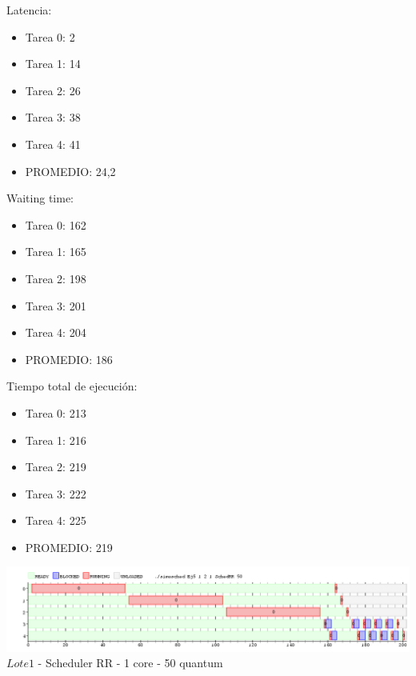 \indent Latencia:\
\begin{itemize}
 \item Tarea 0: 2
 \item Tarea 1: 14
 \item Tarea 2: 26
 \item Tarea 3: 38
 \item Tarea 4: 41
 \item PROMEDIO: 24,2
\end{itemize}
\indent Waiting time:\
\begin{itemize}
 \item Tarea 0: 162
 \item Tarea 1: 165
 \item Tarea 2: 198
 \item Tarea 3: 201
 \item Tarea 4: 204
 \item PROMEDIO: 186
\end{itemize}
\indent Tiempo total de ejecuci\'{o}n:\
\begin{itemize}
 \item Tarea 0: 213
 \item Tarea 1: 216
 \item Tarea 2: 219
 \item Tarea 3: 222
 \item Tarea 4: 225
 \item PROMEDIO: 219
\end{itemize}

\begin{center}
  	\includegraphics[width=450pt]{./Test/ej5_50.png}
	  {$Lote 1$ - Scheduler RR - 1 core - 50 quantum}	
\end{center}

